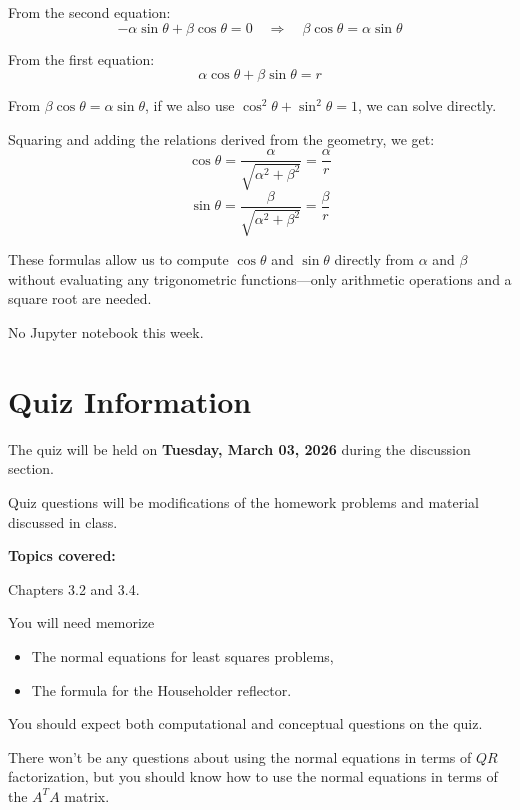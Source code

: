 \documentclass[reqno, answers]{exam}
\begin{document}
\begin{enumerate}
\begin{solution}
From the second equation:
\[
-\alpha\sin\theta + \beta\cos\theta = 0 \quad \Rightarrow \quad \beta\cos\theta = \alpha\sin\theta
\]

From the first equation:
\[
\alpha\cos\theta + \beta\sin\theta = r
\]

From $\beta\cos\theta = \alpha\sin\theta$, if we also use $\cos^2\theta + \sin^2\theta = 1$, we can solve directly.

Squaring and adding the relations derived from the geometry, we get:
\[
\cos\theta = \frac{\alpha}{\sqrt{\alpha^2 + \beta^2}} = \frac{\alpha}{r}
\]
\[
\sin\theta = \frac{\beta}{\sqrt{\alpha^2 + \beta^2}} = \frac{\beta}{r}
\]

These formulas allow us to compute $\cos\theta$ and $\sin\theta$ directly from $\alpha$ and $\beta$ without evaluating any trigonometric functions---only arithmetic operations and a square root are needed.
\end{solution}

\end{enumerate}

No Jupyter notebook this week.



\section*{Quiz Information}

The quiz will be held on {\bf Tuesday, March 03, 2026} during the discussion section.

Quiz questions will be modifications of the homework problems and material discussed in class.

\textbf{Topics covered:} 

Chapters 3.2 and 3.4. 

You will need memorize 
\begin{itemize}
    \item The normal equations for least squares problems,
    \item The formula for the Householder reflector.
\end{itemize}

You should expect both computational and conceptual questions on the quiz.

There won't be any questions about using the normal equations in terms of $QR$ factorization, but you should know how to use the normal equations in terms of the $A^T A$ matrix.
\end{document}
